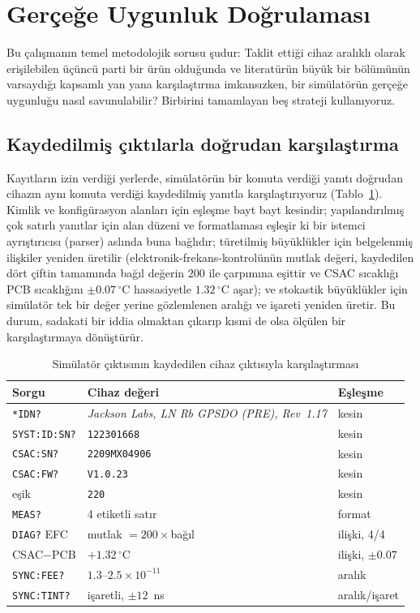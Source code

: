 \documentclass[9pt,twocolumn,a4paper]{extarticle}
\begin{document}
\section{Gerçeğe Uygunluk Doğrulaması}
\label{sec:validation}
Bu çalışmanın temel metodolojik sorusu şudur: Taklit ettiği cihaz aralıklı olarak erişilebilen üçüncü parti bir ürün olduğunda ve literatürün büyük bir bölümünün varsaydığı kapsamlı yan yana karşılaştırma imkansızken, bir simülatörün gerçeğe uygunluğu nasıl savunulabilir? Birbirini tamamlayan beş strateji kullanıyoruz.

\subsection{Kaydedilmiş çıktılarla doğrudan karşılaştırma}
Kayıtların izin verdiği yerlerde, simülatörün bir komuta verdiği yanıtı doğrudan cihazın aynı komuta verdiği kaydedilmiş yanıtla karşılaştırıyoruz (Tablo~\ref{tab:fidelity}). Kimlik ve konfigürasyon alanları için eşleşme bayt bayt kesindir; yapılandırılmış çok satırlı yanıtlar için alan düzeni ve formatlaması eşleşir ki bir istemci ayrıştırıcısı (parser) aslında buna bağlıdır; türetilmiş büyüklükler için belgelenmiş ilişkiler yeniden üretilir (elektronik-frekans-kontrolünün mutlak değeri, kaydedilen dört çiftin tamamında bağıl değerin $200$ ile çarpımına eşittir ve CSAC sıcaklığı PCB sıcaklığını $\pm0.07\,^\circ$C hassasiyetle $1.32\,^\circ$C aşar); ve stokastik büyüklükler için simülatör tek bir değer yerine gözlemlenen aralığı ve işareti yeniden üretir. Bu durum, sadakati bir iddia olmaktan çıkarıp kısmi de olsa ölçülen bir karşılaştırmaya dönüştürür.

\begin{table}[t]
\caption{Simülatör çıktısının kaydedilen cihaz çıktısıyla karşılaştırması}
\label{tab:fidelity}
\centering
\footnotesize
\renewcommand{\arraystretch}{1.2}
\begin{tabular}{@{}p{}p{}p{}@{}}
\toprule
\textbf{Sorgu} & \textbf{Cihaz değeri} & \textbf{Eşleşme} \\
\midrule
\texttt{*IDN?} & \emph{Jackson Labs, LN Rb GPSDO (PRE), Rev~1.17} & kesin \\
\texttt{SYST:ID:SN?} & \texttt{122301668} & kesin \\
\texttt{CSAC:SN?} & \texttt{2209MX04906} & kesin \\
\texttt{CSAC:FW?} & \texttt{V1.0.23} & kesin \\
eşik & \texttt{220} & kesin \\
\texttt{MEAS?} & 4 etiketli satır & format \\
\texttt{DIAG?} EFC & mutlak $=200\times$bağıl & ilişki, 4/4 \\
CSAC$-$PCB & $+1.32\,^\circ$C & ilişki, $\pm0.07$ \\
\texttt{SYNC:FEE?} & $1.3$--$2.5\times10^{-11}$ & aralık \\
\texttt{SYNC:TINT?} & işaretli, $\pm12$~ns & aralık/işaret \\
\bottomrule
\end{tabular}
\end{table}
\end{document}
